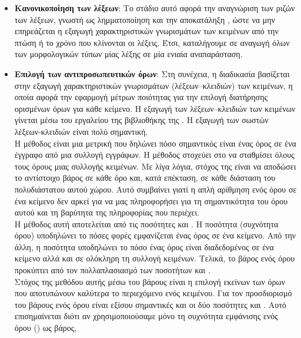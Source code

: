 {{{{{{\begin{itemize}
Το {} περιέχει μία λίστα από {} αποθηκευμένα σε δεκαέξι διαφορετικές γλώσσες.
Στο σημείο αυτό απομακρύνουμε, επίσης, τα αριθμητικά δεδομένα και τα σημεία στίξης.
 \item \textbf{Κανονικοποίηση των λέξεων}: Το στάδιο αυτό αφορά την αναγνώριση των ριζών των λέξεων, 
 γνωστή ως λημματοποίηση {} και την αποκατάληξη {}, 
ώστε να μην επηρεάζεται η εξαγωγή χαρακτηριστικών γνωρισμάτων των κειμένων από την πτώση ή το χρόνο που κλίνονται οι λέξεις. 
Έτσι, καταλήγουμε σε αναγωγή όλων των μορφολογικών τύπων μίας λέξης σε μία ενιαία αναπαράσταση. 
\item \textbf{Επιλογή των αντιπροσωπευτικών όρων}: Στη συνέχεια, η διαδικασία βασίζεται στην εξαγωγή χαρακτηριστικών γνωρισμάτων (λέξεων–κλειδιών) των κειμένων, η οποία αφορά την
εφαρμογή μέτρων ποιότητας για την επιλογή διατήρησης ορισμένων όρων για κάθε κείμενο. 
Η εξαγωγή των λέξεων–κλειδιών των κειμένων γίνεται μέσω του εργαλείου {} \cite{Tfidf01}
της βιβλιοθήκης {} της {}. Η εξαγωγή των σωστών λέξεων-κλειδιών είναι πολύ σημαντική. \\
Η μέθοδος \textbf{{}} \cite{Tfidf02} είναι μια μετρική που δηλώνει πόσο σημαντικός είναι ένας όρος σε ένα έγγραφο από μια συλλογή εγγράφων. 
Η μέθοδος {} στοχεύει στο να σταθμίσει όλους τους όρους μιας συλλογής κειμένων. 
Με λίγα λόγια, στόχος της είναι να αποδώσει το αντίστοιχο βάρος σε κάθε όρο και, κατά επέκταση, σε κάθε διάσταση του πολυδιάστατου αυτού χώρου. 
Αυτό συμβαίνει γιατί η απλή αρίθμηση ενός όρου σε ένα κείμενο δεν αρκεί για να μας πληροφορήσει 
για τη σημαντικότητα του όρου αυτού και τη βαρύτητα της πληροφορίας που περιέχει. \\
Η μέθοδος αυτή αποτελείται από τις ποσότητες {} και {}. 
Η ποσότητα {} (συχνότητα όρου) υποδηλώνει το πόσες φορές εμφανίζεται ένας όρος σε ένα κείμενο. 
Από την άλλη, η ποσότητα {} υποδηλώνει το πόσο ένας όρος είναι διαδεδομένος σε 
ένα κείμενο αλλά και σε ολόκληρη τη συλλογή κειμένων. 
Τελικά, το βάρος ενός όρου προκύπτει από τον πολλαπλασιασμό των ποσοτήτων {} και {}. \\
Στόχος της μεθόδου αυτής μέσω του βάρους είναι η επιλογή εκείνων των όρων που αποτυπώνουν καλύτερα το περιεχόμενο ενός κειμένου.
Για τον προσδιορισμό του βάρους ενός όρου είναι εξίσου σημαντικές και οι δύο ποσότητες 
{} και {}.
Αυτό επισημαίνεται διότι αν χρησιμοποιούσαμε μόνο τη συχνότητα εμφάνισης ενός όρου ({}) ως βάρος,

\end{itemize}}}}}}}
